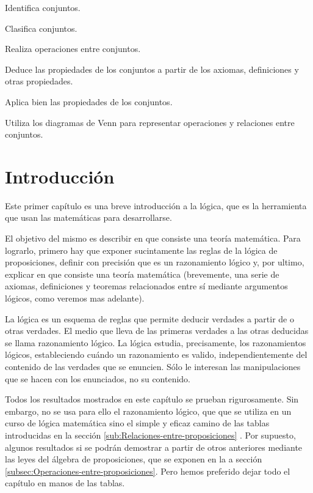 \noindent

\begin{logros} 
\noindent
\begin{lista}  

\item Identifica conjuntos. 

\item Clasifica conjuntos. 

\item Realiza operaciones entre conjuntos.

\item Deduce las propiedades de los conjuntos a partir de los axiomas,
definiciones y otras propiedades.

\item Aplica bien las propiedades de los conjuntos.

\item Utiliza los diagramas de Venn para representar operaciones
y relaciones entre conjuntos. 

\end{lista} \end{logros}

\section{Introducción}

Este primer capítulo es una breve introducción a la lógica, que es
la herramienta que usan las matemáticas para desarrollarse.

El objetivo del mismo es describir en que consiste una teoría matemática.
Para lograrlo, primero hay que exponer sucintamente las reglas de
la lógica de proposiciones, definir con precisión que es un razonamiento
lógico y, por ultimo, explicar en que consiste una teoría matemática
(brevemente, una serie de axiomas, definiciones y teoremas relacionados
entre sí mediante argumentos lógicos, como veremos mas adelante). 

La lógica es un esquema de reglas que permite deducir verdades a partir
de o otras verdades. El medio que lleva de las primeras verdades a
las otras deducidas se llama razonamiento lógico. La lógica estudia,
precisamente, los razonamientos lógicos, estableciendo cuándo un razonamiento
es valido, independientemente del contenido de las verdades que se
enuncien. Sólo le interesan las manipulaciones que se hacen con los
enunciados, no su contenido.

Todos los resultados mostrados en este capítulo se prueban rigurosamente.
Sin embargo, no se usa para ello el razonamiento lógico, que que se
utiliza en un curso de lógica matemática sino el simple y eficaz camino
de las tablas introducidas en la sección \ref{sub:Relaciones-entre-proposiciones}
. Por supuesto, algunos resultados si se podrán demostrar a partir
de otros anteriores mediante las leyes del álgebra de proposiciones,
que se exponen en la a sección \ref{subsec:Operaciones-entre-proposiciones}.
Pero hemos preferido dejar todo el capítulo en manos de las tablas.

